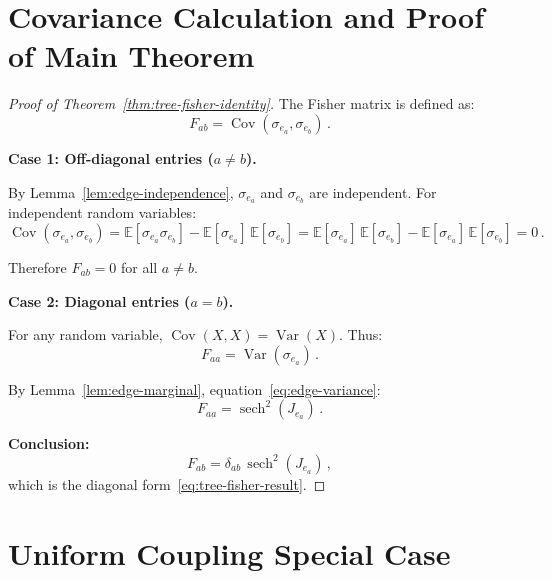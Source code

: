 \documentclass[11pt]{article}
\theoremstyle{definition}
\theoremstyle{remark}
\begin{document}
\section{Covariance Calculation and Proof of Main Theorem}
\label{sec:covariance}

\begin{proof}[Proof of Theorem~\ref{thm:tree-fisher-identity}]
The Fisher matrix is defined as:
\begin{equation}
F_{ab} = \operatorname{Cov}(\sigma_{e_a}, \sigma_{e_b})\,.
\end{equation}

\textbf{Case 1: Off-diagonal entries ($a \neq b$).}

By Lemma~\ref{lem:edge-independence}, $\sigma_{e_a}$ and $\sigma_{e_b}$
are independent. For independent random variables:
\begin{equation}
\operatorname{Cov}(\sigma_{e_a}, \sigma_{e_b})
= \mathbb{E}[\sigma_{e_a} \sigma_{e_b}] - \mathbb{E}[\sigma_{e_a}]\,\mathbb{E}[\sigma_{e_b}]
= \mathbb{E}[\sigma_{e_a}]\,\mathbb{E}[\sigma_{e_b}] - \mathbb{E}[\sigma_{e_a}]\,\mathbb{E}[\sigma_{e_b}]
= 0\,.
\end{equation}

Therefore $F_{ab} = 0$ for all $a \neq b$.

\textbf{Case 2: Diagonal entries ($a = b$).}

For any random variable, $\operatorname{Cov}(X, X) = \operatorname{Var}(X)$.
Thus:
\begin{equation}
F_{aa} = \operatorname{Var}(\sigma_{e_a})\,.
\end{equation}

By Lemma~\ref{lem:edge-marginal}, equation~\eqref{eq:edge-variance}:
\begin{equation}
F_{aa} = \operatorname{sech}^2(J_{e_a})\,.
\end{equation}

\textbf{Conclusion:}
\begin{equation}
F_{ab} = \delta_{ab}\, \operatorname{sech}^2(J_{e_a})\,,
\end{equation}
which is the diagonal form~\eqref{eq:tree-fisher-result}.
\end{proof}

\section{Uniform Coupling Special Case}
\end{document}
